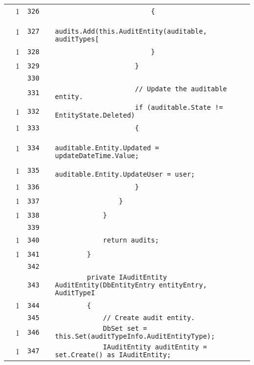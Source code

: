 \documentclass[a4paper,10pt]{article}
\begin{document}
\begin{longtable}[l]{lrrll}
\cellcolor{green} & 1 & \verb~326~ & & \verb~                        {~\\
\cellcolor{green} & 1 & \verb~327~ & & \verb~                            audits.Add(this.AuditEntity(auditable, auditTypes[~\\
\cellcolor{green} & 1 & \verb~328~ & & \verb~                        }~\\
\cellcolor{green} & 1 & \verb~329~ & & \verb~                    }~\\
\cellcolor{gray} &  & \verb~330~ & & \verb~~\\
\cellcolor{gray} &  & \verb~331~ & & \verb~                    // Update the auditable entity.~\\
\cellcolor{green} & 1 & \verb~332~ & & \verb~                    if (auditable.State != EntityState.Deleted)~\\
\cellcolor{green} & 1 & \verb~333~ & & \verb~                    {~\\
\cellcolor{green} & 1 & \verb~334~ & & \verb~                        auditable.Entity.Updated = updateDateTime.Value;~\\
\cellcolor{green} & 1 & \verb~335~ & & \verb~                        auditable.Entity.UpdateUser = user;~\\
\cellcolor{green} & 1 & \verb~336~ & & \verb~                    }~\\
\cellcolor{green} & 1 & \verb~337~ & & \verb~                }~\\
\cellcolor{green} & 1 & \verb~338~ & & \verb~            }~\\
\cellcolor{gray} &  & \verb~339~ & & \verb~~\\
\cellcolor{green} & 1 & \verb~340~ & & \verb~            return audits;~\\
\cellcolor{green} & 1 & \verb~341~ & & \verb~        }~\\
\cellcolor{gray} &  & \verb~342~ & & \verb~~\\
\cellcolor{gray} &  & \verb~343~ & & \verb~        private IAuditEntity AuditEntity(DbEntityEntry entityEntry, AuditTypeI~\\
\cellcolor{green} & 1 & \verb~344~ & & \verb~        {~\\
\cellcolor{gray} &  & \verb~345~ & & \verb~            // Create audit entity.~\\
\cellcolor{green} & 1 & \verb~346~ & & \verb~            DbSet set = this.Set(auditTypeInfo.AuditEntityType);~\\
\cellcolor{green} & 1 & \verb~347~ & & \verb~            IAuditEntity auditEntity = set.Create() as IAuditEntity;~\\

\end{longtable}
\end{document}
